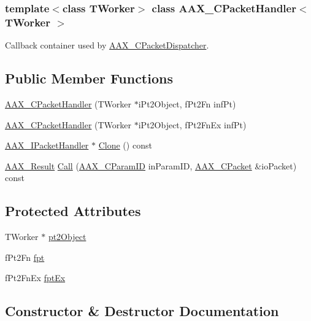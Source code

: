 \subsubsection*{template$<$class T\+Worker$>$\newline
class A\+A\+X\+\_\+\+C\+Packet\+Handler$<$ T\+Worker $>$}

Callback container used by \mbox{\hyperlink{a01529}{A\+A\+X\+\_\+\+C\+Packet\+Dispatcher}}. \subsection*{Public Member Functions}
\begin{DoxyCompactItemize}
\item 
\mbox{\hyperlink{a01525_a9199efa88f418df9c8e5caade283c147}{A\+A\+X\+\_\+\+C\+Packet\+Handler}} (T\+Worker $\ast$i\+Pt2\+Object, f\+Pt2\+Fn inf\+Pt)
\item 
\mbox{\hyperlink{a01525_aed86dcf0713ac1a983f6795170812c52}{A\+A\+X\+\_\+\+C\+Packet\+Handler}} (T\+Worker $\ast$i\+Pt2\+Object, f\+Pt2\+Fn\+Ex inf\+Pt)
\item 
\mbox{\hyperlink{a01521}{A\+A\+X\+\_\+\+I\+Packet\+Handler}} $\ast$ \mbox{\hyperlink{a01525_ac297f4d9c97ff438566b83a097866f46}{Clone}} () const
\item 
\mbox{\hyperlink{a00392_a4d8f69a697df7f70c3a8e9b8ee130d2f}{A\+A\+X\+\_\+\+Result}} \mbox{\hyperlink{a01525_a29228bebdc801e6cbf0b67873c6d69ca}{Call}} (\mbox{\hyperlink{a00392_a1440c756fe5cb158b78193b2fc1780d1}{A\+A\+X\+\_\+\+C\+Param\+ID}} in\+Param\+ID, \mbox{\hyperlink{a01513}{A\+A\+X\+\_\+\+C\+Packet}} \&io\+Packet) const
\end{DoxyCompactItemize}
\subsection*{Protected Attributes}
\begin{DoxyCompactItemize}
\item 
T\+Worker $\ast$ \mbox{\hyperlink{a01525_ab9a5f88d1159060f5532aafb730dd861}{pt2\+Object}}
\item 
f\+Pt2\+Fn \mbox{\hyperlink{a01525_a9350d1cc36f20c821c90d2372219561f}{fpt}}
\item 
f\+Pt2\+Fn\+Ex \mbox{\hyperlink{a01525_aca6624820388e64f13d1b824dde033f5}{fpt\+Ex}}
\end{DoxyCompactItemize}


\subsection{Constructor \& Destructor Documentation}
\mbox{\label{a01525_a9199efa88f418df9c8e5caade283c147}} 
